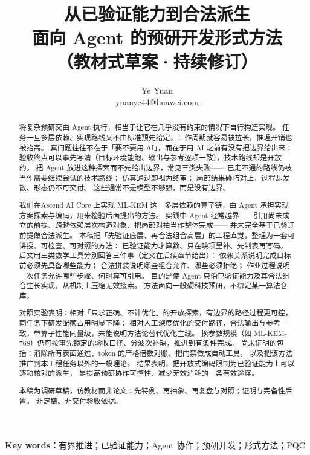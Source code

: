 \documentclass[UTF8,a4paper,11pt]{ctexart}
\title{从已验证能力到合法派生\\
{\large 面向 Agent 的预研开发形式方法\\（教材式草案·持续修订）}}
\author{Ye Yuan\\
\small\url{yuanye44@huawei.com}}
\date{}
\theoremstyle{definition}
\theoremstyle{plain}
\theoremstyle{remark}
\numberwithin{figure}{section}
\numberwithin{table}{section}
\begin{document}
\maketitle

\begin{abstract}
将复杂预研交由 Agent 执行，相当于让它在几乎没有约束的情况下自行构造实现。
任务一旦多层依赖、实现路线又不由标准预先给定，工作周期就容易被拉长，推理开销也被抬高。
真问题往往不在于「要不要用 AI」，而在于用 AI 之前有没有把边界给出来：
验收终点可以事先写清（目标环境能跑、输出与参考逐项一致），技术路线却是开放的。
把 Agent 放进这种探索而不先给出边界，常见三类失败——
已走不通的路线仍被当作需要继续尝试的技术路线；
仿真通过即视为终审；
局部结果碰巧对上，过程却发散、形态仍不可交付。
这些通常不是模型不够强，而是没有边界。

我们在Ascend AI Core 上实现 ML-KEM 这一多层依赖的算子链，由 Agent 承担实现方案探索与编码，用来检验后面提出的方法。
实践中 Agent 经常越界——引用尚未成立的前提、跨越依赖层次构造对象、把局部对拍当作整体完成——
并未完全基于已验证前提做合法派生。
本稿把「先验证底层、再合法组合高层」的工程直觉，整理为一套可讲授、可检查、可对照的方法：
已验证能力才算数、只在缺项里补、先制表再写码。
后文用三类数学工具分别回答三件事（定义在后续章节给出）：
依赖关系说明完成目标前必须先具备哪些能力；
合法拼装说明哪些组合允许、哪些必须拒绝；
作业过程说明一次任务允许哪些步骤、何时算可引用。
目的是使 Agent 只沿已验证能力及其合法组合生长实现，从机制上压缩无效搜索。
方法面向一般硬科技预研，不绑定某一算法仓库。

对照实验表明：相对「只求正确、不计优化」的开放探索，有边界的路径过程更可控，同任务下研发配额占用明显下降；
相对人工深度优化的交付路径，合法输出与参考一致，单算子性能同量级，未能说明方法论替代优化主线。
换参数规模（如 ML-KEM-768）仍可按事先锁定的验收口径、分波次补缺，推进到有条件完成。
尚未证明的包括：消除所有表面通过、token 的严格倍数对账、把门禁做成自动工具，
以及把该方法推广到本工程任务以外的一般理论。
结果表明，把开放式编码限制为已验证能力上可以逐项核对的派生，
是提高预研协作可控性、减少无效消耗的一条有效途径。

本稿为调研草稿，仿教材而非论文：先特例、再抽象、再复盘与对照；证明与完备性后置。
非定稿、非交付验收依据。
\end{abstract}

\begin{center}
\textbf{Key words：}有界推进；已验证能力；Agent 协作；预研开发；形式方法；PQC
\end{center}

\newpage
\tableofcontents
\newpage
\end{document}

